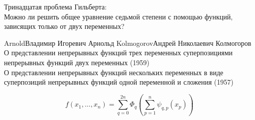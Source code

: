 \documentclass[24pt,pdf,hyperref={unicode}]{beamer}
\begin{document}
\begin{frame}

\end{frame}


\begin{frame}
\end{frame}

\begin{frame}
Тринадцатая проблема Гильберта:\\[1cm]

Можно ли решить общее уравнение седьмой степени с помощью функций, зависящих только от двух переменных?
\end{frame}

\begin{frame}
\begin{small}
\doublebio
{Arnold}{Владимир Игоревич Арнольд}
{Kolmogorov}{Андрей Николаевич Колмогоров}
{
$ $\\[0.2cm]

О представлении непрерывных функций трех переменных суперпозициями непрерывных функций двух переменных (1959)\\[0.2cm]

О представлении непрерывных функций нескольких переменных в виде суперпозиций непрерывных функций одной переменной и сложения (1957)}
\end{small}
\end{frame}

\begin{frame}

$$
f(x_1,\dots,x_n)=\sum_{q=0}^{2 n} \Phi_q \left(\sum_{p=1}^n\psi_{q,p}(x_p)\right)
$$
\end{frame}
\end{document}
